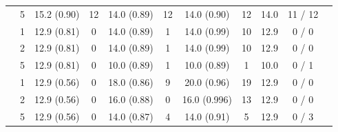 \begin{table}[!htbp]
\begin{tabular}{@{}rcccccccccc@{}}
     & 5 & 15.2 (0.90) & 12 & 14.0 (0.89) & 12 & 14.0 (0.90) & 12 & 14.0 & 11 / 12\\
    \addlinespace
    2500 & 1 & 12.9 (0.81) & 0 & 14.0 (0.89) & 1 & 14.0 (0.99) & 10 & 12.9 & 0 / 0\\
     & 2 & 12.9 (0.81) & 0 & 14.0 (0.89) & 1 & 14.0 (0.99) & 10 & 12.9 & 0 / 0\\
     & 5 & 12.9 (0.81) & 0 & 10.0 (0.89) & 1 & 10.0 (0.89) & 1 & 10.0 & 0 / 1\\
    \addlinespace
    2875 & 1 & 12.9 (0.56) & 0 & 18.0 (0.86) & 9 & 20.0 (0.96) & 19 & 12.9 & 0 / 0\\
     & 2 & 12.9 (0.56) & 0 & 16.0 (0.88) & 0 & 16.0 (0.996) & 13 & 12.9 & 0 / 0\\
     & 5 & 12.9 (0.56) & 0 & 14.0 (0.87) & 4 & 14.0 (0.91) & 5 & 12.9 & 0 / 3\\
    \bottomrule
  \end{tabular}
\end{table}

